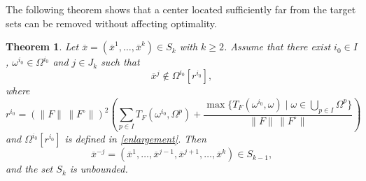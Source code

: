 \documentclass[sn-mathphys-num]{sn-jnl}%
\newtheorem{theorem}{Theorem}[section]
\theoremstyle{definition}
\begin{document}
The following theorem shows that a center located sufficiently far from the target sets can be removed without affecting optimality.

\begin{theorem}
	\label{G.O.Solutions_9} Let $\overline{x}=(\overline{x}^1,\dots,\overline{x}^k)\in S_k$ with $k\ge 2$. 
	Assume that there exist $i_0 \in I$,  $\omega^{i_0} \in \Omega^{i_0}$ and $j \in J_k$ such that
	\[
	\overline{x}^j \notin \Omega^{i_0}[r^{i_0}],
	\]
	where 
	\begin{equation}\label{ri0}
		r^{i_0}= (\|F\|\,\|F^\circ\|)^2\left(\sum_{p\in I}T_F(\omega^{i_0},\Omega^p)
		+\frac{\max\big\{T_F(\omega^{i_0},\omega)\mid \omega \in \bigcup_{p \in I}\Omega^p\big\}}{\|F\|\,\|F^\circ\|}\right)   
	\end{equation}
	and $\Omega^{i_0}[r^{i_0}]$ is defined in \eqref{enlargement}. 
	Then
	\[
	\overline{x}^{-j}= (\overline{x}^1,\dots,\overline{x}^{j-1},\overline{x}^{j+1},\dots,\overline{x}^{k}) \in S_{k-1},
	\]
	and the set $S_k$ is unbounded.
\end{theorem}
\end{document}
